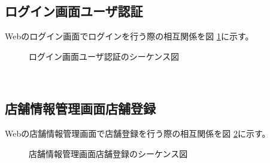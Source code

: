 \documentclass[a4j]{jarticle}
\begin{document}
\subsection{ログイン画面ユーザ認証}
Webのログイン画面でログインを行う際の相互関係を図 \ref {tab:oonishi1}に示す。
\begin{figure}[H]
\begin{center}
\caption{ログイン画面ユーザ認証のシーケンス図}
\label{tab:oonishi1}
\end{center}
\end{figure}　　
\subsection{店舗情報管理画面店舗登録}
Webの店舗情報管理画面で店舗登録を行う際の相互関係を図 \ref {tab:oonishi2}に示す。
\begin{figure}[H]
\begin{center}
\caption{店舗情報管理画面店舗登録のシーケンス図}
\label {tab:oonishi2}
\end{center}
\end{figure}
\end{document}
